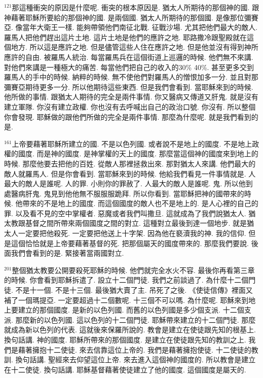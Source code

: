 \documentclass{book}
\begin{document}
$^{121}$那這種衝突的原因是什麼呢.
衝突的根本原因是.
猶太人所期待的那個神的國.
跟神藉著耶穌所要給的那個神的國.
是兩個國.
猶太人所期待的那個國.
是像那位彌賽亞.
像當年大衛王一樣.
能夠帶領他們南征北戰.
征戰沙場.
尤其把他們最大的敵人.
羅馬人把他們趕出這片土地.
這片土地是他們的應許之地.
耶路撒冷跟聖殿就在這個地方.
所以這是應許之地.
但是儘管這些人住在應許之地.
但是他並沒有得到神所應許的自由.
被羅馬人統治.
每當羅馬兵在這個街道上巡邏的時候.
他們無不來講.
對他們來講是一種極大的痛苦.
每當他們把自己的收入的30\% 40\%.
甚至更多交到羅馬人的手中的時候.
納粹的時候.
無不使他們對羅馬人的憎恨加多一分.
並且對那彌賽亞期待更多一分.
所以他期待這些東西.
但是我們會看到.
當耶穌來到的時候.
他所做的事情.
跟猶太人期待的完全是兩件事情.
你又醫病又傳道又肝鬼.
就是沒有建立軍隊.
你沒有建立政權.
你也沒有去呼喊出自己的政治口號.
你沒有.
所以整個你會發現.
耶穌做的跟他們所做的完全是兩件事情.
那麼為什麼呢.
就是我們看到的是.

$^{161}$上帝要藉著耶穌所建立的國.
不是以色列國.
或者說不是地上的國度.
不是地上政權的國度.
而是神的國度.
是神掌權的天上的國度.
那麼當這個神的國度來到地上的時候.
那麼他要去把他的百姓.
從敵人那裡拯救出來.
那對猶太人來講.
他們最大的敵人就羅馬人.
但是你會看到.
當耶穌來到的時候.
他給我們看見一件事情就是.
人最大的敵人是誰呢.
人的罪.
小則你的罪赦了.
人最大的敵人是誰呢.
鬼.
所以他到處醫病肝鬼.
鬼見到他他無不服服服跪拜.
所以你看到.
當耶穌把神的國帶來的時候.
他帶來的不是地上的國度.
而這個國度的敵人也不是地上的.
是人心裡的自己的罪.
以及看不見的空中掌權者.
惡魔或者我們叫撒旦.
這就成為了我們說猶太人.
猶太教跟基督之間所帶來兩個國度之間的對立.
這種對立最後到達一個地步.
就是猶太人一定要把他殺死.
一定要把他送上十字架.
因為他在褻瀆我的神.
我的信仰.
但是這個恰恰就是上帝要藉著基督的死.
把那個屬天的國度帶來的.
那麼我們要說.
後面我們會看到的是.
緊接著當兩國對立.

$^{201}$整個猶太教要公開要殺死耶穌的時候.
他們就完全水火不容.
最後你再看第三章的時候.
你會看到耶穌拆遣了.
設立十二個門徒.
我們之前談過了.
為什麼十二個門徒.
不是十一個.
不是十三個.
最後猶大賣了主.
吊死了之後.
《使徒信傳》裡面又補了一個瑪提亞.
一定要超過十二個數呢.
十三個不可以嗎.
為什麼呢.
耶穌來到地上要建立的那個國度.
是新的以色列國.
而舊的以色列國是多少個支派.
十二個支派.
那麼新的以色列國.
這以色列的十二個門徒.
耶穌帶來建立的十二個門徒.
那麼就成為新以色列的代表.
這就後來保羅所說的.
教會是建立在使徒跟先知的根基上.
換句話講.
神的國度.
耶穌所帶來的那個國度.
是建立在使徒跟先知的教訓之上.
我們是藉著擁抱十二使徒.
來去信靠這位上帝的.
我們是藉著擁抱使徒.
十二使徒的教訓.
換句話講.
聖經來去仰望這位上帝.
來去進入這個神的國度的.
所以教會是建立在十二使徒.
換句話講.
耶穌基督藉著使徒建立了他的國度.
這個國度是屬天的.
\end{document}
